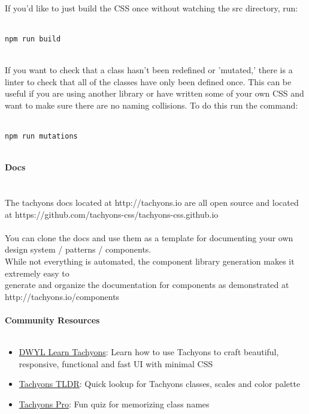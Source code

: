 \documentclass{article}
\begin{document}
\\
If you'd like to just build the CSS once without watching the src directory, run:\\
\\
\begin{lstlisting}npm run build\end{lstlisting}
\\
If you want to check that a class hasn't been redefined or 'mutated,' there is a linter to check that all of the classes have only been defined once. This can be useful if you are using another library or have written some of your own CSS and want to make sure there are no naming collisions. To do this run the command:\\
\\
\begin{lstlisting}npm run mutations\end{lstlisting}
\\
{\noindent \LARGE \textbf{Docs}}\\\\
\\
The tachyons docs located at http://tachyons.io are all open source and located at https://github.com/tachyons-css/tachyons-css.github.io\\
\\
You can clone the docs and use them as a template for documenting your own design system / patterns / components.\\
While not everything is automated, the component library generation makes it extremely easy to\\
generate and organize the documentation for components as demonstrated at http://tachyons.io/components\\
\\
{\noindent \Large \textbf{Community Resources}}\\\\
\begin{itemize}
	\item \href{https://github.com/dwyl/learn-tachyons}{DWYL Learn Tachyons}: Learn how to use Tachyons to craft beautiful, responsive, functional and fast UI with minimal CSS
	\item \href{https://tachyons-tldr.now.sh/#/classes}{Tachyons TLDR}: Quick lookup for Tachyons classes, scales and color palette
	\item \href{https://tachyonspro.netlify.app/}{Tachyons Pro}: Fun quiz for memorizing class names
\end{itemize}
\\
\end{document}
